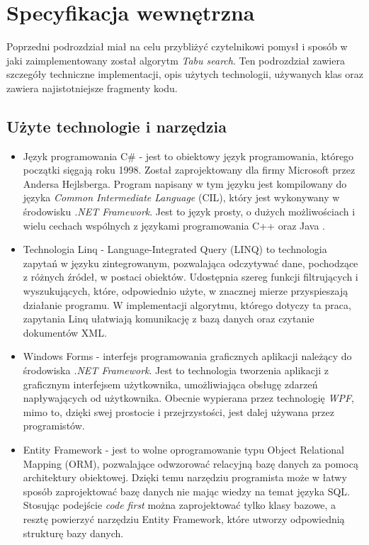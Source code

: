\section{Specyfikacja wewnętrzna}

Poprzedni podrozdział miał na celu przybliżyć czytelnikowi pomysł i sposób w jaki zaimplementowany został algorytm \textit{Tabu search}. Ten podrozdział zawiera szczegóły techniczne implementacji, opis użytych technologii, używanych klas oraz zawiera najistotniejsze fragmenty kodu.

\subsection{Użyte technologie i narzędzia}

\begin{itemize}
	\item Język programowania C\# - jest to obiektowy język programowania, którego początki sięgają roku 1998. Został zaprojektowany dla firmy Microsoft przez Andersa Hejlsberga. Program napisany w tym języku jest kompilowany do języka \textit{Common Intermediate Language} (CIL), który jest wykonywany w środowisku \textit{.NET Framework}. Jest to język prosty, o dużych możliwościach i wielu cechach wspólnych z językami programowania C++ oraz Java \cite{Csharp}. 
	
	\item Technologia Linq - Language-Integrated Query (LINQ) to technologia zapytań w języku zintegrowanym, pozwalająca odczytywać dane, pochodzące z różnych źródeł, w postaci obiektów. Udostępnia szereg funkcji filtrujących i wyszukujących, które, odpowiednio użyte, w znacznej mierze przyspieszają działanie programu. W implementacji algorytmu, którego dotyczy ta praca, zapytania Linq ułatwiają komunikację z bazą danych oraz czytanie dokumentów XML.
	
	\item Windows Forms - interfejs programowania graficznych aplikacji należący do środowiska \textit{.NET Framework}. Jest to technologia tworzenia aplikacji z graficznym interfejsem użytkownika, umożliwiająca obsługę zdarzeń napływających od użytkownika. Obecnie wypierana przez technologię  \textit{WPF}, mimo to, dzięki swej prostocie i przejrzystości, jest dalej używana przez programistów.
	 
	\item Entity Framework - jest to wolne oprogramowanie typu Object Relational Mapping (ORM), pozwalające odwzorować relacyjną bazę danych za pomocą architektury obiektowej. Dzięki temu narzędziu programista może w łatwy sposób zaprojektować bazę danych nie mając wiedzy na temat języka SQL. Stosując podejście \textit{code first} można zaprojektować tylko klasy bazowe, a resztę powierzyć narzędziu Entity Framework, które utworzy odpowiednią strukturę bazy danych.
	 

\end{itemize}
